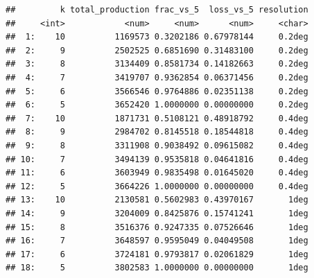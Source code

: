 \documentclass[
  11pt,
]{article}
\begin{document}
\begin{verbatim}
##         k total_production frac_vs_5  loss_vs_5 resolution
##     <int>            <num>     <num>      <num>     <char>
##  1:    10          1169573 0.3202186 0.67978144     0.2deg
##  2:     9          2502525 0.6851690 0.31483100     0.2deg
##  3:     8          3134409 0.8581734 0.14182663     0.2deg
##  4:     7          3419707 0.9362854 0.06371456     0.2deg
##  5:     6          3566546 0.9764886 0.02351138     0.2deg
##  6:     5          3652420 1.0000000 0.00000000     0.2deg
##  7:    10          1871731 0.5108121 0.48918792     0.4deg
##  8:     9          2984702 0.8145518 0.18544818     0.4deg
##  9:     8          3311908 0.9038492 0.09615082     0.4deg
## 10:     7          3494139 0.9535818 0.04641816     0.4deg
## 11:     6          3603949 0.9835498 0.01645020     0.4deg
## 12:     5          3664226 1.0000000 0.00000000     0.4deg
## 13:    10          2130581 0.5602983 0.43970167       1deg
## 14:     9          3204009 0.8425876 0.15741241       1deg
## 15:     8          3516376 0.9247335 0.07526646       1deg
## 16:     7          3648597 0.9595049 0.04049508       1deg
## 17:     6          3724181 0.9793817 0.02061829       1deg
## 18:     5          3802583 1.0000000 0.00000000       1deg
\end{verbatim}
\end{document}
